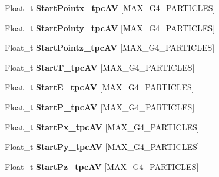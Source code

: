 \begin{DoxyCompactItemize}
\item 
\hypertarget{classanatree_a7c2896c7c9d15800bf2698b993894dfe}{Float\-\_\-t {\bfseries Start\-Pointx\-\_\-tpc\-A\-V} \mbox{[}M\-A\-X\-\_\-\-G4\-\_\-\-P\-A\-R\-T\-I\-C\-L\-E\-S\mbox{]}}\label{classanatree_a7c2896c7c9d15800bf2698b993894dfe}

\item 
\hypertarget{classanatree_aff4cc7905cae8c91dfae706d77fe894f}{Float\-\_\-t {\bfseries Start\-Pointy\-\_\-tpc\-A\-V} \mbox{[}M\-A\-X\-\_\-\-G4\-\_\-\-P\-A\-R\-T\-I\-C\-L\-E\-S\mbox{]}}\label{classanatree_aff4cc7905cae8c91dfae706d77fe894f}

\item 
\hypertarget{classanatree_ad71b098c7d57e1af196dd8620c08b861}{Float\-\_\-t {\bfseries Start\-Pointz\-\_\-tpc\-A\-V} \mbox{[}M\-A\-X\-\_\-\-G4\-\_\-\-P\-A\-R\-T\-I\-C\-L\-E\-S\mbox{]}}\label{classanatree_ad71b098c7d57e1af196dd8620c08b861}

\item 
\hypertarget{classanatree_a960484efdcfc749574bb4ecf7ff6954c}{Float\-\_\-t {\bfseries Start\-T\-\_\-tpc\-A\-V} \mbox{[}M\-A\-X\-\_\-\-G4\-\_\-\-P\-A\-R\-T\-I\-C\-L\-E\-S\mbox{]}}\label{classanatree_a960484efdcfc749574bb4ecf7ff6954c}

\item 
\hypertarget{classanatree_a1a2088c9d8cade01f5dd8bb10d1f333c}{Float\-\_\-t {\bfseries Start\-E\-\_\-tpc\-A\-V} \mbox{[}M\-A\-X\-\_\-\-G4\-\_\-\-P\-A\-R\-T\-I\-C\-L\-E\-S\mbox{]}}\label{classanatree_a1a2088c9d8cade01f5dd8bb10d1f333c}

\item 
\hypertarget{classanatree_a32c58d98d48ac9acd69666d3699de6ba}{Float\-\_\-t {\bfseries Start\-P\-\_\-tpc\-A\-V} \mbox{[}M\-A\-X\-\_\-\-G4\-\_\-\-P\-A\-R\-T\-I\-C\-L\-E\-S\mbox{]}}\label{classanatree_a32c58d98d48ac9acd69666d3699de6ba}

\item 
\hypertarget{classanatree_a424d9106c9827a8829e5d001726d2d2c}{Float\-\_\-t {\bfseries Start\-Px\-\_\-tpc\-A\-V} \mbox{[}M\-A\-X\-\_\-\-G4\-\_\-\-P\-A\-R\-T\-I\-C\-L\-E\-S\mbox{]}}\label{classanatree_a424d9106c9827a8829e5d001726d2d2c}

\item 
\hypertarget{classanatree_adbef8aabd6ce8b49f666f7857aa07530}{Float\-\_\-t {\bfseries Start\-Py\-\_\-tpc\-A\-V} \mbox{[}M\-A\-X\-\_\-\-G4\-\_\-\-P\-A\-R\-T\-I\-C\-L\-E\-S\mbox{]}}\label{classanatree_adbef8aabd6ce8b49f666f7857aa07530}

\item 
\hypertarget{classanatree_a41bbac8dc4d0708fb0d79470eb4f08ac}{Float\-\_\-t {\bfseries Start\-Pz\-\_\-tpc\-A\-V} \mbox{[}M\-A\-X\-\_\-\-G4\-\_\-\-P\-A\-R\-T\-I\-C\-L\-E\-S\mbox{]}}\label{classanatree_a41bbac8dc4d0708fb0d79470eb4f08ac}


\end{DoxyCompactItemize}
